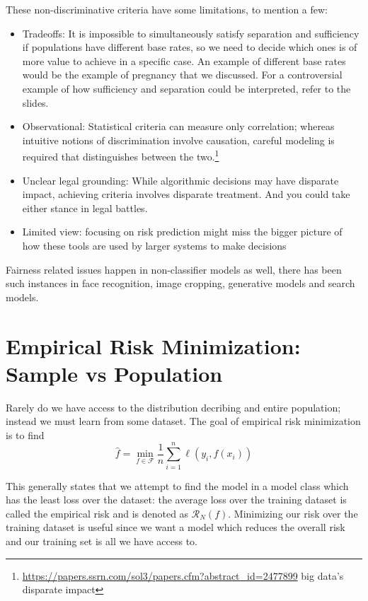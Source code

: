 These non-discriminative criteria have some limitations, to mention a few:
\begin{itemize}
    \item Tradeoffs:  It is impossible to simultaneously satisfy separation and sufficiency if populations have different base rates, so we need to decide which ones is of more value to achieve in a specific case.  An example of different base rates would be the example of pregnancy that we discussed. For a controversial example of how sufficiency and separation could be interpreted, refer to the slides.\cite{kleinberg2016inherent}
    \item Observational: Statistical criteria can measure only correlation; whereas intuitive notions of discrimination involve causation, careful modeling is required that distinguishes between the two.\footnote{\url{https://papers.ssrn.com/sol3/papers.cfm?abstract_id=2477899} {big data's disparate impact}}
    \item Unclear legal grounding: While algorithmic decisions may have disparate impact, achieving criteria involves disparate treatment. And you could take either stance in legal battles.
    \item Limited view: focusing on risk prediction might miss the bigger picture of how these tools are used by larger systems to make decisions
\end{itemize}

Fairness related issues happen in non-classifier models as well, there has been such instances in face recognition, image cropping, generative models and search models.

\section{Empirical Risk Minimization: Sample vs Population}\label{sec:sample_vs_population}

Rarely do we have access to the distribution decribing and entire population; instead we must learn from some dataset. The goal of empirical risk minimization is to find 
$$\hat{f} = \min_{f \in \mathcal{F}}\frac{1}{n} \sum_{i = 1}^{n} \ell(y_i, f(x_i))$$

This generally states that we attempt to find the model in a model class which has the least loss over the dataset: the average loss over the training dataset is called the empirical risk and is denoted as $\mathcal{R}_N(f)$. Minimizing our risk over the training dataset is useful since we want a model which reduces the overall risk and our training set is all we have access to. 

